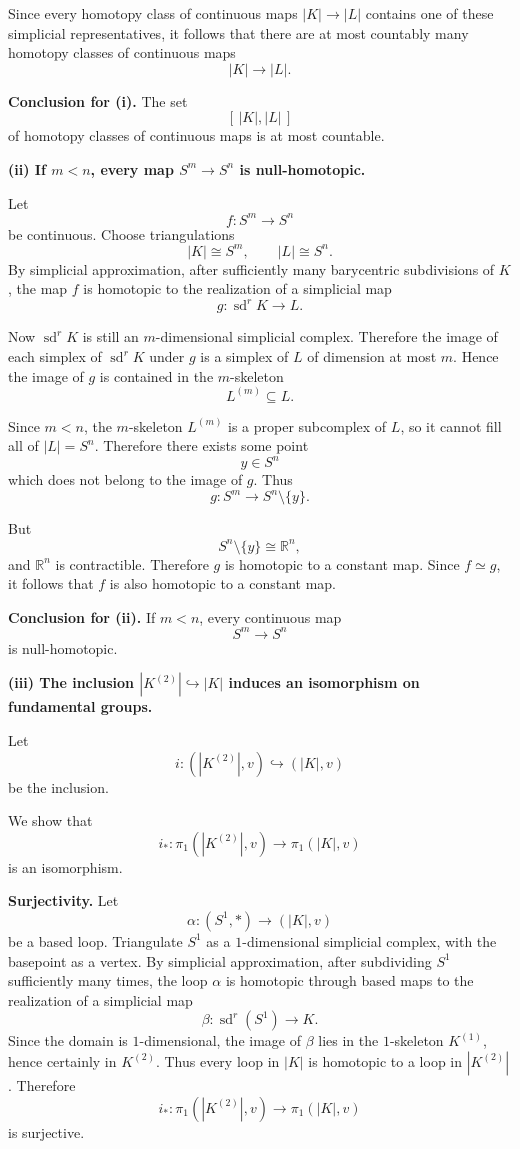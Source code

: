 \documentclass[12pt,a4paper]{article}
\theoremstyle{notespace}
\begin{document}
Since every homotopy class of continuous maps \(|K|\to |L|\) contains one of these simplicial representatives, it follows that there are at most countably many homotopy classes of continuous maps
\[
|K|\to |L|.
\]

\medskip

\textbf{Conclusion for (i).}
The set
\[
[\,|K|,|L|\,]
\]
of homotopy classes of continuous maps is at most countable.

\bigskip

\textbf{(ii) If \(m<n\), every map \(S^m\to S^n\) is null-homotopic.}

Let
\[
f:S^m\to S^n
\]
be continuous. Choose triangulations
\[
|K|\cong S^m,
\qquad
|L|\cong S^n.
\]
By simplicial approximation, after sufficiently many barycentric subdivisions of \(K\), the map \(f\) is homotopic to the realization of a simplicial map
\[
g:\operatorname{sd}^r K \to L.
\]

Now \(\operatorname{sd}^r K\) is still an \(m\)-dimensional simplicial complex. Therefore the image of each simplex of \(\operatorname{sd}^r K\) under \(g\) is a simplex of \(L\) of dimension at most \(m\). Hence the image of \(g\) is contained in the \(m\)-skeleton
\[
L^{(m)} \subseteq L.
\]

Since \(m<n\), the \(m\)-skeleton \(L^{(m)}\) is a proper subcomplex of \(L\), so it cannot fill all of \(|L|=S^n\). Therefore there exists some point
\[
y\in S^n
\]
which does not belong to the image of \(g\). Thus
\[
g:S^m \to S^n\setminus \{y\}.
\]

But
\[
S^n\setminus \{y\}\cong \mathbb R^n,
\]
and \(\mathbb R^n\) is contractible. Therefore \(g\) is homotopic to a constant map. Since \(f\simeq g\), it follows that \(f\) is also homotopic to a constant map.

\medskip

\textbf{Conclusion for (ii).}
If \(m<n\), every continuous map
\[
S^m\to S^n
\]
is null-homotopic.

\bigskip

\textbf{(iii) The inclusion \( |K^{(2)}| \hookrightarrow |K| \) induces an isomorphism on fundamental groups.}

Let
\[
i:(|K^{(2)}|,v)\hookrightarrow (|K|,v)
\]
be the inclusion.

We show that
\[
i_*:\pi_1(|K^{(2)}|,v)\to \pi_1(|K|,v)
\]
is an isomorphism.

\medskip

\textbf{Surjectivity.}
Let
\[
\alpha:(S^1,*)\to (|K|,v)
\]
be a based loop. Triangulate \(S^1\) as a \(1\)-dimensional simplicial complex, with the basepoint as a vertex. By simplicial approximation, after subdividing \(S^1\) sufficiently many times, the loop \(\alpha\) is homotopic through based maps to the realization of a simplicial map
\[
\beta:\operatorname{sd}^r(S^1)\to K.
\]
Since the domain is \(1\)-dimensional, the image of \(\beta\) lies in the \(1\)-skeleton \(K^{(1)}\), hence certainly in \(K^{(2)}\). Thus every loop in \(|K|\) is homotopic to a loop in \(|K^{(2)}|\). Therefore
\[
i_*:\pi_1(|K^{(2)}|,v)\to \pi_1(|K|,v)
\]
is surjective.
\end{document}
